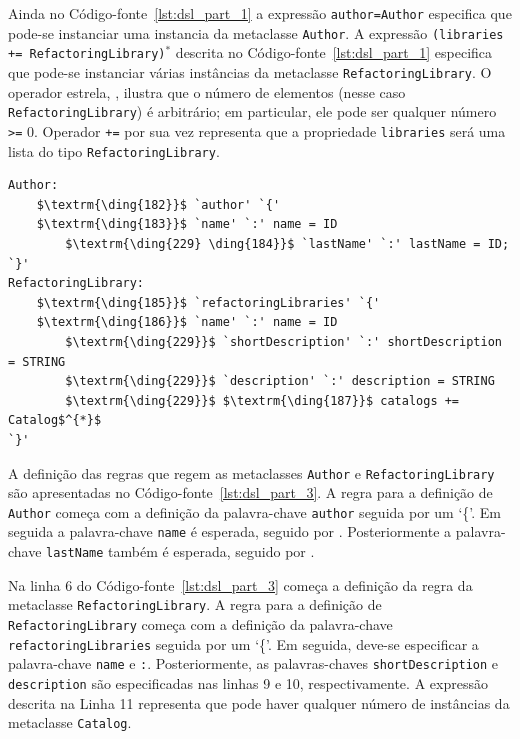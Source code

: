 Ainda no Código-fonte~\ref{lst:dsl_part_1} a expressão \texttt{author=Author} especifica que pode-se instanciar uma instancia da metaclasse \texttt{Author}. A expressão \texttt{(libraries += RefactoringLibrary)$^{*}$} descrita no Código-fonte~\ref{lst:dsl_part_1} especifica que pode-se instanciar várias instâncias da metaclasse \texttt{RefactoringLibrary}. O operador estrela, \aspas{\texttt{*}}, ilustra que o número de elementos (nesse caso \texttt{RefactoringLibrary}) é arbitrário; em particular, ele pode ser qualquer número \texttt{>=} 0. Operador \texttt{+=} por sua vez representa que a propriedade \texttt{libraries} será uma lista do tipo \texttt{RefactoringLibrary}.

\begin{lstlisting}[language=Xtext, frame=single, basicstyle=\scriptsize, mathescape=true, label={lst:dsl_part_3}, caption={Gramática da DSL - parte 3}]
Author:
	$\textrm{\ding{182}}$ `author' `{'
	$\textrm{\ding{183}}$ `name' `:' name = ID  
		$\textrm{\ding{229} \ding{184}}$ `lastName' `:' lastName = ID; 
`}'
RefactoringLibrary:
	$\textrm{\ding{185}}$ `refactoringLibraries' `{'
	$\textrm{\ding{186}}$ `name' `:' name = ID  
		$\textrm{\ding{229}}$ `shortDescription' `:' shortDescription = STRING
		$\textrm{\ding{229}}$ `description' `:' description = STRING
		$\textrm{\ding{229}}$ $\textrm{\ding{187}}$ catalogs += Catalog$^{*}$
`}'
\end{lstlisting}

A definição das regras que regem as metaclasses \texttt{Author} e \texttt{RefactoringLibrary} são apresentadas no Código-fonte~\ref{lst:dsl_part_3}. A regra para a definição de \texttt{Author} começa com a definição da palavra-chave \texttt{author} seguida por um `\{'. Em seguida a palavra-chave \texttt{name} é esperada, seguido por \aspas{\texttt{:}} . Posteriormente a palavra-chave \texttt{lastName} também é esperada, seguido por \aspas{\texttt{:}} . 

Na linha 6 do Código-fonte~\ref{lst:dsl_part_3} começa a definição da regra da metaclasse \texttt{RefactoringLibrary}. A regra para a definição de \texttt{RefactoringLibrary} começa com a definição da palavra-chave \texttt{refactoringLibraries} seguida por um `\{'. Em seguida, deve-se especificar a palavra-chave \texttt{name} e \texttt{:}. Posteriormente, as palavras-chaves \texttt{shortDescription} e \texttt{description} são especificadas nas linhas 9 e 10, respectivamente. A expressão descrita na Linha 11 representa que pode haver qualquer número de instâncias da metaclasse \texttt{Catalog}.


